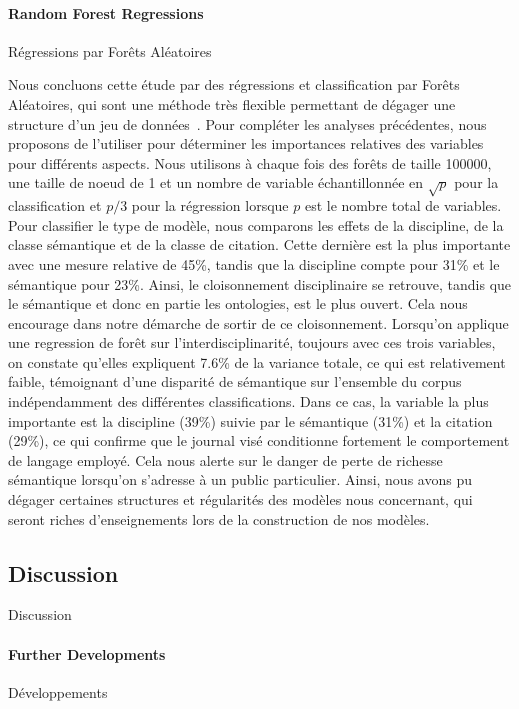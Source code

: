 \paragraph{Random Forest Regressions}{Régressions par Forêts Aléatoires}

Nous concluons cette étude par des régressions et classification par Forêts Aléatoires, qui sont une méthode très flexible permettant de dégager une structure d'un jeu de données~\cite{liaw2002classification}. Pour compléter les analyses précédentes, nous proposons de l'utiliser pour déterminer les importances relatives des variables pour différents aspects. Nous utilisons à chaque fois des forêts de taille 100000, une taille de noeud de 1 et un nombre de variable échantillonnée en $\sqrt{p}$ pour la classification et $p/3$ pour la régression lorsque $p$ est le nombre total de variables. Pour classifier le type de modèle, nous comparons les effets de la discipline, de la classe sémantique et de la classe de citation. Cette dernière est la plus importante avec une mesure relative de 45\%, tandis que la discipline compte pour 31\% et le sémantique pour 23\%. Ainsi, le cloisonnement disciplinaire se retrouve, tandis que le sémantique et donc en partie les ontologies, est le plus ouvert. Cela nous encourage dans notre démarche de sortir de ce cloisonnement. Lorsqu'on applique une regression de forêt sur l'interdisciplinarité, toujours avec ces trois variables, on constate qu'elles expliquent 7.6\% de la variance totale, ce qui est relativement faible, témoignant d'une disparité de sémantique sur l'ensemble du corpus indépendamment des différentes classifications. Dans ce cas, la variable la plus importante est la discipline (39\%) suivie par le sémantique (31\%) et la citation (29\%), ce qui confirme que le journal visé conditionne fortement le comportement de langage employé. Cela nous alerte sur le danger de perte de richesse sémantique lorsqu'on s'adresse à un public particulier. Ainsi, nous avons pu dégager certaines structures et régularités des modèles nous concernant, qui seront riches d'enseignements lors de la construction de nos modèles.



\subsection{Discussion}{Discussion}


\paragraph{Further Developments}{Développements}

